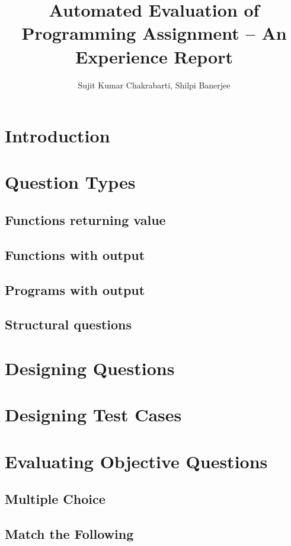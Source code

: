 \documentclass{article}
\title{Automated Evaluation of Programming Assignment -- An Experience Report}
\author{Sujit Kumar Chakrabarti, Shilpi Banerjee}
\date{}
\begin{document}
\maketitle
\section{Introduction}

\section{Question Types}
\subsection{Functions returning value}

\subsection{Functions with output}

\subsection{Programs with output}

\subsection{Structural questions}

\section{Designing Questions}

\section{Designing Test Cases}

\section{Evaluating Objective Questions}

\subsection{Multiple Choice}

\subsection{Match the Following}
\end{document}
